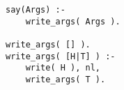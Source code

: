 \begin{verbatim}
say(Args) :- 
    write_args( Args ).

write_args( [] ).
write_args( [H|T] ) :-
    write( H ), nl,
    write_args( T ).
\end{verbatim}
